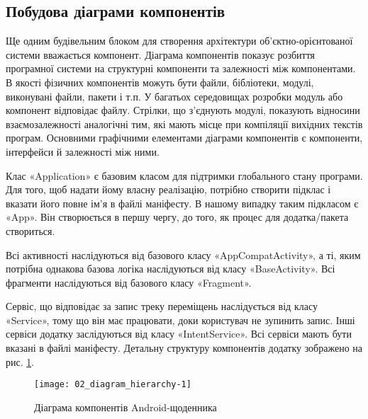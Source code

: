\documentclass[../main.tex]{subfiles}
\begin{document}
\subsection{Побудова діаграми компонентів} %
Ще одним будівельним блоком для створення архітектури \mbox{об'єктно-орієнтованої} системи вважається компонент. Діаграма компонентів показує розбиття програмної системи на структурні компоненти та залежності між компонентами. В якості фізичних компонентів можуть бути файли, бібліотеки, модулі, виконувані файли, пакети і т.п. У багатьох середовищах розробки модуль або компонент відповідає файлу. Стрілки, що з'єднують модулі, показують відносини взаємозалежності аналогічні тим, які мають місце при компіляції вихідних текстів програм. Основними графічними елементами діаграми компонентів є компоненти, інтерфейси й залежності між ними. 

Клас «Application» є базовим класом для підтримки глобального стану програми. Для того, щоб надати йому власну реалізацію, потрібно створити підклас і вказати його повне ім'я в файлі маніфесту. В нашому випадку таким підкласом є «App». Він створюється в першу чергу, до того, як процес для додатка/пакета створиться.

Всі активності наслідуються від базового класу «AppCompatActivity», а ті, яким потрібна однакова базова логіка наслідуються від класу «BaseActivity». Всі фрагменти наслідуються від базового класу «Fragment».

Сервіс, що відповідає за запис треку переміщень наслідується від класу «Service», тому що він має працювати, доки користувач не зупинить запис. Інші сервіси додатку заслідуються від класу «IntentService». Всі сервіси мають бути вказані в файлі маніфесту. Детальну структуру компонентів додатку зображено на рис. \ref{diagram:hierarchy}.

\begin{figure}[H]
	\centering
	\texttt{[image: 02\_diagram\_hierarchy-1]}
	\caption{Діаграма компонентів Android-щоденника}
	\label{diagram:hierarchy}
\end{figure}

\end{document}
